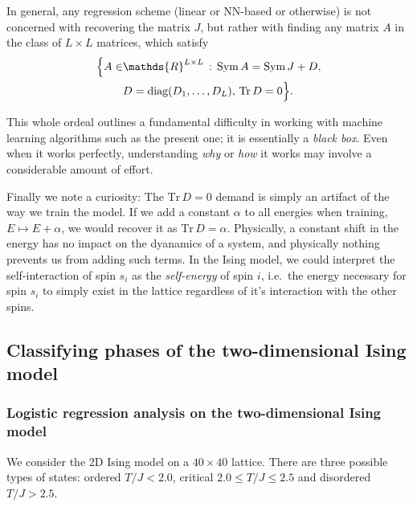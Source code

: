 \documentclass[a4paper, twocolumn]{article}
\begin{document}
In general, any regression scheme (linear or NN-based or otherwise) is not concerned with recovering the matrix $J$, but rather with finding any matrix $A$ in the class of $L\times L$ matrices, which satisfy
\begin{align}
\Big\{A\in &\mathds{R}^{L\times L}\,:\,\sym A=\sym J+D, \nonumber \\
& D=\text{diag}(D_1,\dots,D_L), \,\text{Tr}\,D=0 \Big\}.
\end{align}



This whole ordeal outlines a fundamental difficulty in working with machine learning algorithms such as the present one; it is essentially a \textit{black box}. Even when it works perfectly, understanding \textit{why} or \textit{how} it works may involve a considerable amount of effort.

Finally we note a curiosity: The $\text{Tr}\,D=0$ demand is simply an artifact of the way we train the model. If we add a constant $\alpha$ to all energies when training, $E\mapsto E+\alpha$, we would recover it as $\text{Tr}\,D=\alpha$. Physically, a constant shift in the energy has no impact on the dyanamics of a system, and physically nothing prevents us from adding such terms. In the Ising model, we could interpret the self-interaction of spin $s_i$ as the \textit{self-energy} of spin $i$, i.e.\ the energy necessary for spin $s_i$ to simply exist in the lattice regardless of it's interaction with the other spins.


\subsection{Classifying phases of the two-dimensional Ising model}

\subsubsection{Logistic regression analysis on the two-dimensional Ising model}
We consider the 2D Ising model on a $40 \times 40$ lattice. There are three possible types of states: ordered $T/J < 2.0$, 
critical $2.0 \leq T/J \leq 2.5$ and disordered $ T/J > 2.5$.
\end{document}
